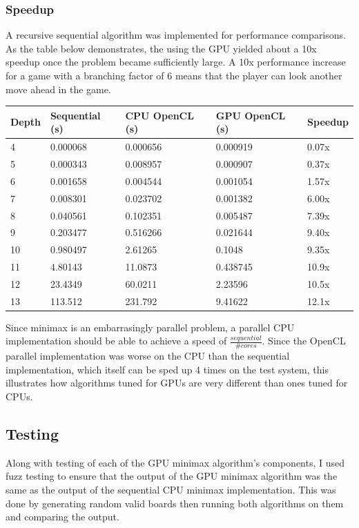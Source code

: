 \documentclass{article}
\begin{document}
\subsubsection{Speedup}
A recursive sequential algorithm was implemented for performance comparisons. As the table below demonstrates, the using the GPU yielded about a 10x speedup once the problem became sufficiently large. A 10x performance increase for a game with a branching factor of 6 means that the player can look another move ahead in the game.

\begin{tabular}{| l | l | l | l | l |}
  \hline
  Depth & Sequential (s) & CPU OpenCL (s) & GPU OpenCL (s) & Speedup\\
  \hline
  4 & 0.000068 & 0.000656 & 0.000919 & 0.07x \\
  5 & 0.000343 & 0.008957 & 0.000907 & 0.37x \\
  6 & 0.001658 & 0.004544 & 0.001054 & 1.57x \\
  7 & 0.008301 & 0.023702 & 0.001382 & 6.00x \\
  8 & 0.040561 & 0.102351 & 0.005487 & 7.39x \\
  9 & 0.203477 & 0.516266 & 0.021644 & 9.40x \\
  10 & 0.980497 & 2.61265 & 0.1048 & 9.35x \\
  11 & 4.80143 & 11.0873 & 0.438745 & 10.9x \\
  12 & 23.4349 & 60.0211 & 2.23596 & 10.5x \\
  13 & 113.512 & 231.792 & 9.41622 & 12.1x \\
  \hline
\end{tabular}
Since minimax is an embarrasingly parallel problem, a parallel CPU implementation should be able to achieve a speed of $\frac{sequential}{\# cores}$. Since the OpenCL parallel implementation was worse on the CPU than the sequential implementation, which itself can be sped up 4 times on the test system, this illustrates how algorithms tuned for GPUs are very different than ones tuned for CPUs.

\subsection{Testing}
Along with testing of each of the GPU minimax algorithm's components, I used fuzz testing to ensure that the output of the GPU minimax algorithm was the same as the output of the sequential CPU minimax implementation. This was done by generating random valid boards then running both algorithms on them and comparing the output.
\end{document}
